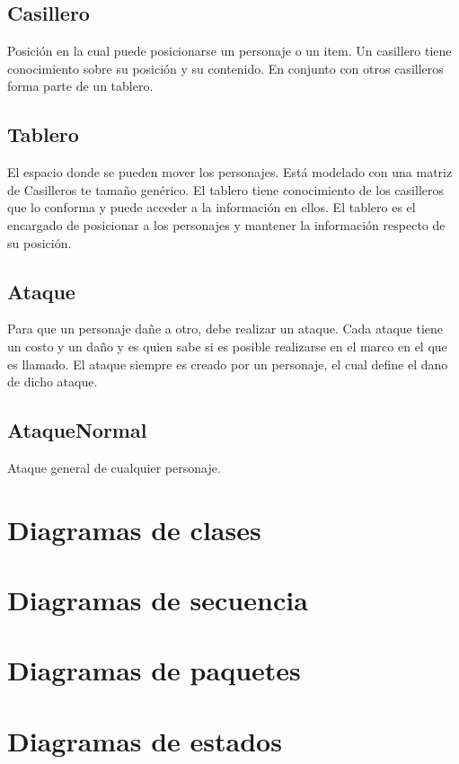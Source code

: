 \documentclass[a4paper]{article}
\begin{document}
\subsection{Casillero}
Posición en la cual puede posicionarse un personaje o un item. Un casillero tiene conocimiento sobre su posición y su contenido. En conjunto con otros casilleros forma parte de un tablero.

\subsection{Tablero} El espacio donde se pueden mover los personajes. Está modelado con una matriz de Casilleros te tamaño genérico. El tablero tiene conocimiento de los casilleros que lo conforma y puede acceder a la información en ellos. El tablero es el encargado de posicionar a los personajes y mantener la información respecto de su posición.

\subsection{Ataque}Para que un personaje dañe a otro, debe realizar un ataque. Cada ataque tiene un costo y un daño y es quien sabe si es posible realizarse en el marco en el que es llamado. El ataque siempre es creado por un personaje, el cual define el dano de dicho ataque. 

\subsection{AtaqueNormal}
Ataque general de cualquier personaje.


\newpage
\section{Diagramas de clases}



\newpage
\section{Diagramas de secuencia}

\newpage
\section{Diagramas de paquetes}
	
\newpage
\section{Diagramas de estados}
\end{document}
